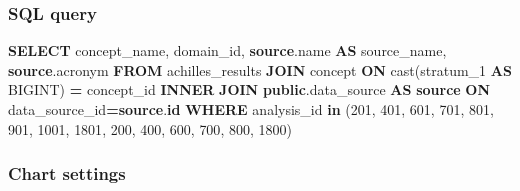 \documentclass[
]{book}
\newenvironment{Shaded}{\begin{snugshade}}{\end{snugshade}}
\newcommand{\DecValTok}[1]{\textcolor[rgb]{0.00,0.00,0.81}{#1}}
\newcommand{\FunctionTok}[1]{\textcolor[rgb]{0.00,0.00,0.00}{#1}}
\newcommand{\KeywordTok}[1]{\textcolor[rgb]{0.13,0.29,0.53}{\textbf{#1}}}
\newcommand{\NormalTok}[1]{#1}
\newcommand{\OperatorTok}[1]{\textcolor[rgb]{0.81,0.36,0.00}{\textbf{#1}}}
\begin{document}
\hypertarget{sql-query-21}{%
\subsubsection*{SQL query}\label{sql-query-21}}

\begin{Shaded}
\begin{Highlighting}[]
\KeywordTok{SELECT}\NormalTok{ concept\_name,}
\NormalTok{     domain\_id,}
     \KeywordTok{source}\NormalTok{.name }\KeywordTok{AS}\NormalTok{ source\_name,}
     \KeywordTok{source}\NormalTok{.acronym}
\KeywordTok{FROM}\NormalTok{ achilles\_results}
\KeywordTok{JOIN}\NormalTok{ concept }\KeywordTok{ON} \FunctionTok{cast}\NormalTok{(stratum\_1 }\KeywordTok{AS}\NormalTok{ BIGINT) }\OperatorTok{=}\NormalTok{ concept\_id}
\KeywordTok{INNER} \KeywordTok{JOIN} \KeywordTok{public}\NormalTok{.data\_source }\KeywordTok{AS} \KeywordTok{source} \KeywordTok{ON}\NormalTok{ data\_source\_id}\OperatorTok{=}\KeywordTok{source}\NormalTok{.}\KeywordTok{id}
\KeywordTok{WHERE}\NormalTok{ analysis\_id }\KeywordTok{in}\NormalTok{ (}\DecValTok{201}\NormalTok{, }\DecValTok{401}\NormalTok{, }\DecValTok{601}\NormalTok{, }\DecValTok{701}\NormalTok{, }\DecValTok{801}\NormalTok{, }\DecValTok{901}\NormalTok{, }\DecValTok{1001}\NormalTok{, }\DecValTok{1801}\NormalTok{, }\DecValTok{200}\NormalTok{, }\DecValTok{400}\NormalTok{, }\DecValTok{600}\NormalTok{, }\DecValTok{700}\NormalTok{, }\DecValTok{800}\NormalTok{, }\DecValTok{1800}\NormalTok{)}
\end{Highlighting}
\end{Shaded}

\hypertarget{chart-settings-22}{%
\subsubsection*{Chart settings}\label{chart-settings-22}}
\end{document}
